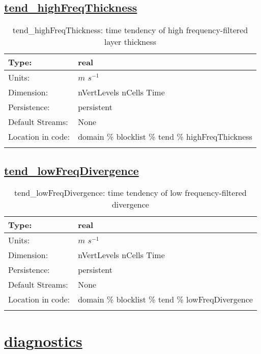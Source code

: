 \subsection[tend\_highFreqThickness]{\hyperref[sec:var_tab_tend]{tend\_highFreqThickness}}
\label{subsec:var_sec_tend_tend_highFreqThickness}
\begin{center}
\begin{longtable}{| p{2.0in} | p{4.0in} |}
        \hline 
        Type: & real \\
        \hline 
        Units: & $m$ $s^{-1}$ \\
        \hline 
        Dimension: & nVertLevels nCells Time \\
        \hline 
        Persistence: & persistent \\
        \hline 
		 Default Streams: & None \\
        \hline 
		 Location in code: & domain \% blocklist \% tend \% highFreqThickness \\
		 \hline 
    \caption{tend\_highFreqThickness: time tendency of high frequency-filtered layer thickness}
\end{longtable}
\end{center}
\subsection[tend\_lowFreqDivergence]{\hyperref[sec:var_tab_tend]{tend\_lowFreqDivergence}}
\label{subsec:var_sec_tend_tend_lowFreqDivergence}
\begin{center}
\begin{longtable}{| p{2.0in} | p{4.0in} |}
        \hline 
        Type: & real \\
        \hline 
        Units: & $m$ $s^{-1}$ \\
        \hline 
        Dimension: & nVertLevels nCells Time \\
        \hline 
        Persistence: & persistent \\
        \hline 
		 Default Streams: & None \\
        \hline 
		 Location in code: & domain \% blocklist \% tend \% lowFreqDivergence \\
		 \hline 
    \caption{tend\_lowFreqDivergence: time tendency of low frequency-filtered divergence}
\end{longtable}
\end{center}
\section[diagnostics]{\hyperref[sec:var_tab_diagnostics]{diagnostics}}
\label{sec:var_sec_diagnostics}
